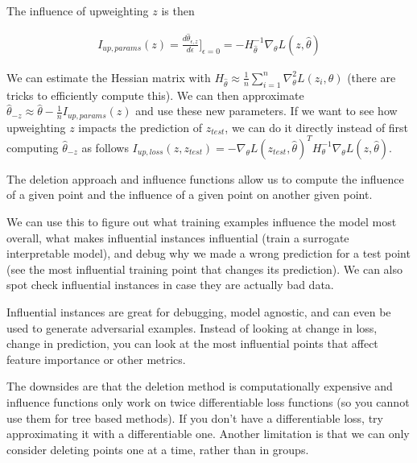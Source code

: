 \documentclass[a4paper]{article}
\begin{document}
The influence of upweighting $z$ is then

\begin{align}
  I_{up, params}(z) = \frac{d \hat{\theta}_{\epsilon, z}}{d \epsilon}]_{\epsilon =
  0} = -H_{\hat{\theta}}^{-1} \nabla_{\theta}{L(z, \hat{\theta})}
\end{align}

We can estimate the Hessian matrix with $H_{\hat{\theta}} \approx \frac{1}{n}
\sum_{i=1}^{n}{\nabla_{\theta}^2 L(z_i, \theta)}$ (there are tricks to efficiently
compute this). We can then approximate $\hat{\theta}_{-z} \approx \hat{\theta}
- \frac{1}{n} I_{up, params}(z)$ and use these new parameters. If we want to
see how upweighting $z$ impacts the prediction of $z_{test}$, we can do it
directly instead of first computing $\hat{\theta}_{-z}$ as follows
$I_{up, loss}(z, z_{test}) = - \nabla_{\theta}{L(z_{test}, \hat{\theta})}^T
H_{\theta}^{-1} \nabla_{\theta}{L(z, \hat{\theta})}$.

The deletion approach and influence functions allow us to compute the influence
of a given point and the influence of a given point on another given point.

We can use this to figure out what training examples influence the model most
overall, what makes influential instances influential (train a surrogate
interpretable model), and debug why we made a wrong prediction for a test point
(see the most influential training point that changes its prediction). We can
also spot check influential instances in case they are actually bad data.

Influential instances are great for debugging, model agnostic, and can even
be used to generate adversarial examples. Instead of looking at change in loss,
change in prediction, you can look at the most influential points that affect
feature importance or other metrics.

The downsides are that the deletion method is computationally expensive and
influence functions only work on twice differentiable loss functions (so you
cannot use them for tree based methods). If you don't have a differentiable loss,
try approximating it with a differentiable one. Another limitation is that we
can only consider deleting points one at a time, rather than in groups.
\end{document}

